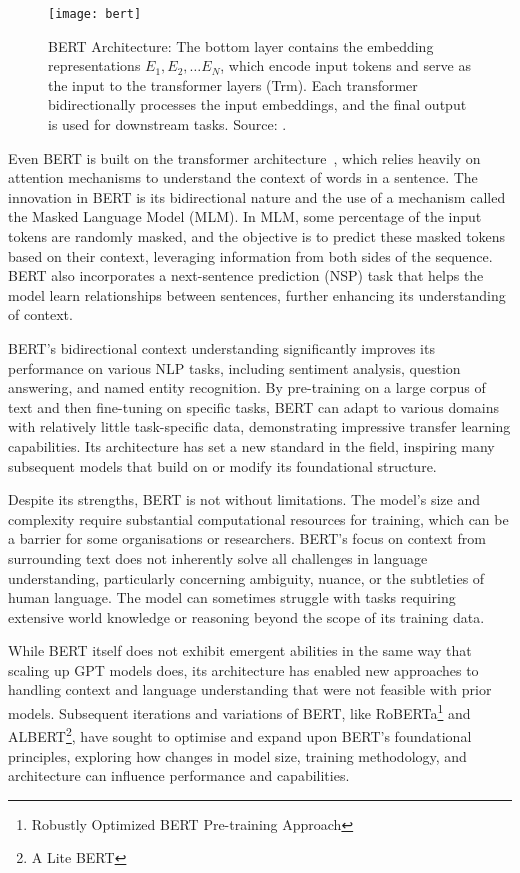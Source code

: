 \begin{figure}[h!]
	\centering
	\texttt{[image: bert]}
	\caption{BERT Architecture: The bottom layer contains the embedding representations \(E_1, E_2, \ldots E_N\), which encode input tokens and serve as the input to the transformer layers (Trm).
		Each transformer bidirectionally processes the input embeddings, and the final output is used for downstream tasks. Source: \textcite{devlin2019bert}.}
	\label{fig:bert-arch}
\end{figure}

Even BERT is built on the transformer architecture~\cite{vaswani2023attention}, which relies heavily on attention mechanisms to understand the context of words in a sentence.
The innovation in BERT is its bidirectional nature and the use of a mechanism called the Masked Language Model (MLM). In MLM, some percentage of the input tokens are randomly masked, and the objective is to predict these masked tokens based on their context, leveraging information from both sides of the sequence.
BERT also incorporates a next-sentence prediction (NSP) task that helps the model learn relationships between sentences, further enhancing its understanding of context.

BERT's bidirectional context understanding significantly improves its performance on various NLP tasks, including sentiment analysis, question answering, and named entity recognition.
By pre-training on a large corpus of text and then fine-tuning on specific tasks, BERT can adapt to various domains with relatively little task-specific data, demonstrating impressive transfer learning capabilities.
Its architecture has set a new standard in the field, inspiring many subsequent models that build on or modify its foundational structure.

Despite its strengths, BERT is not without limitations.
The model's size and complexity require substantial computational resources for training, which can be a barrier for some organisations or researchers.
BERT's focus on context from surrounding text does not inherently solve all challenges in language understanding, particularly concerning ambiguity, nuance, or the subtleties of human language.
The model can sometimes struggle with tasks requiring extensive world knowledge or reasoning beyond the scope of its training data.

While BERT itself does not exhibit emergent abilities in the same way that scaling up GPT models does, its architecture has enabled new approaches to handling context and language understanding that were not feasible with prior models.
Subsequent iterations and variations of BERT, like RoBERTa\footnote{Robustly Optimized BERT Pre-training Approach} and ALBERT\footnote{A Lite BERT}, have sought to optimise and expand upon BERT's foundational principles, exploring how changes in model size, training methodology, and architecture can influence performance and capabilities.

